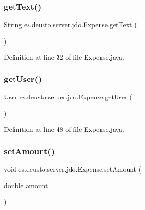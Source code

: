\subsubsection{\texorpdfstring{get\+Text()}{getText()}}
{\footnotesize\ttfamily String es.\+deusto.\+server.\+jdo.\+Expense.\+get\+Text (\begin{DoxyParamCaption}{ }\end{DoxyParamCaption})}



Definition at line 32 of file Expense.\+java.

\mbox{\label{classes_1_1deusto_1_1server_1_1jdo_1_1_expense_aebec4f2e492f8f188c09b7264f19dc57}} 
\subsubsection{\texorpdfstring{get\+User()}{getUser()}}
{\footnotesize\ttfamily \hyperlink{classes_1_1deusto_1_1server_1_1jdo_1_1_user}{User} es.\+deusto.\+server.\+jdo.\+Expense.\+get\+User (\begin{DoxyParamCaption}{ }\end{DoxyParamCaption})}



Definition at line 48 of file Expense.\+java.

\mbox{\label{classes_1_1deusto_1_1server_1_1jdo_1_1_expense_a69c018cdd351649ec59c18685fe7a18b}} 
\subsubsection{\texorpdfstring{set\+Amount()}{setAmount()}}
{\footnotesize\ttfamily void es.\+deusto.\+server.\+jdo.\+Expense.\+set\+Amount (\begin{DoxyParamCaption}\item[{double}]{amount }\end{DoxyParamCaption})}




